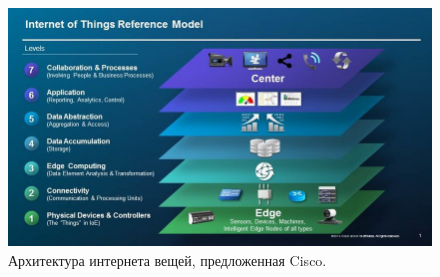 \begin{figure}[h]
	\centering
	\includegraphics[width=\textwidth ]{img/Illustration-of-the-IoT-Reference-Model-by-Cisco-1.png}
	\caption{Архитектура интернета вещей, предложенная Cisco.}
	\label{fig:architecture}
\end{figure} 

